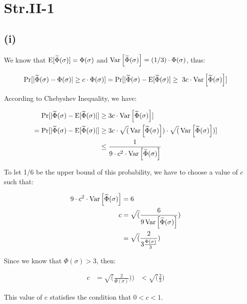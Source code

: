 \section*{Str.II-1}
\subsection*{(i)}
We know that $\operatorname{E}[\widetilde{\Phi}(\sigma)] = \Phi(\sigma)$ and $\operatorname{Var}\left[\widetilde{\Phi}(\sigma)\right] = (1/3)\cdot \Phi(\sigma)$, thus:

$$\Pr[|\widetilde{\Phi}(\sigma)- \Phi(\sigma)| \geq c\cdot \Phi(\sigma)]
= \Pr[|\widetilde{\Phi}(\sigma)- \operatorname{E}[\widetilde{\Phi}(\sigma)] \geq \
3c \cdot \operatorname{Var}\left[\widetilde{\Phi}(\sigma)\right]]$$

According to Chebyshev Inequality, we have:

\begin{equation*}
  \begin{aligned}
\Pr[|\widetilde{\Phi}(\sigma)- \operatorname{E}[\widetilde{\Phi}(\sigma)|] &\geq 
3c \cdot \operatorname{Var}\left[\widetilde{\Phi}(\sigma)\right]] \\
= \Pr[|\widetilde{\Phi}(\sigma)- \operatorname{E}[\widetilde{\Phi}(\sigma)|] 
&\geq 3c \cdot \sqrt(\operatorname{Var}\left[\widetilde{\Phi}(\sigma)\right]) \cdot \sqrt(\operatorname{Var}\left[\widetilde{\Phi}(\sigma)\right])] \\
&\leq \frac{1}{9 \cdot c^2 \cdot
  \operatorname{Var}\left[\widetilde{\Phi}(\sigma)\right]}
\end{aligned}
\end{equation*}

To let 1/6 be the upper bound of this probability, we have to choose a value of $c$ such that:

\begin{equation*}
  \begin{aligned}
9 \cdot c^2 \cdot \operatorname{Var}\left[\widetilde{\Phi}(\sigma)\right] &= 6\\
c &= \sqrt(\frac{6}{9\operatorname{Var}\left[\widetilde{\Phi}(\sigma)\right]})\\
&= \sqrt(\frac{2}{3 \frac{\Phi(\sigma)}{3}})
\end{aligned}
\end{equation*}

Since we know that $\Phi(\sigma) > 3$, then:

\begin{equation*}
  \begin{aligned}
c &= \sqrt(\frac{2}{\Phi(\sigma)}))
& < \sqrt(\frac{2}{3})
\end{aligned}
\end{equation*}

This value of c statisfies the condition that $0 < c < 1$.

